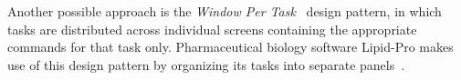 \documentclass[conference]{IEEEtran}
\begin{document}
Another possible approach is the \emph{Window Per Task}~\cite{Zeeshan:2011} design pattern, in which tasks are distributed
across individual screens containing the appropriate commands for that task only. Pharmaceutical
biology software Lipid-Pro makes use of this design pattern by organizing its tasks into separate
panels~\cite{Ahmed:2014}. 




%
%



%
%
\end{document}
